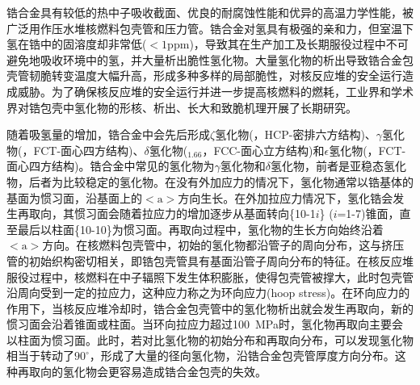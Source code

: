 \maketitle
锆合金具有较低的热中子吸收截面、优良的耐腐蚀性能和优异的高温力学性能，被广泛用作压水堆核燃料包壳管和压力管。锆合金对氢具有极强的亲和力，但室温下氢在锆中的固溶度却非常低\textrm{($<1\mathrm{ppm}$)}，导致其在生产加工及长期服役过程中不可避免地吸收环境中的氢，并大量析出脆性氢化物。大量氢化物的析出导致锆合金包壳管韧脆转变温度大幅升高，形成多种多样的局部脆性，对核反应堆的安全运行造成威胁。为了确保核反应堆的安全运行并进一步提高核燃料的燃耗，工业界和学术界对锆包壳中氢化物的形核、析出、长大和致脆机理开展了长期研究。

随着吸氢量的增加，锆合金中会先后形成$\zeta$氢化物\textrm{(，HCP-密排六方结构)}、$\gamma$氢化物\textrm{(，FCT-面心四方结构)}、$\delta$氢化物\textrm{($_{1.66}$，FCC-面心立方结构)}和$\epsilon$氢化物\textrm{(，FCT-面心四方结构)}。锆合金中常见的氢化物为$\gamma$氢化物和$\delta$氢化物，前者是亚稳态氢化物，后者为比较稳定的氢化物。在没有外加应力的情况下，氢化物通常以锆基体的基面为惯习面，沿基面上的$<\mathrm{a}>$方向生长。在外加拉应力情况下，氢化锆会发生再取向，其惯习面会随着拉应力的增加逐步从基面转向\textrm{\{10-1$i$\} ($i$=1-7)}锥面，直至最后以柱面\{10-10\}为惯习面。再取向过程中，氢化物的生长方向始终沿着$<\mathrm{a}>$方向。在核燃料包壳管中，初始的氢化物都沿管子的周向分布，这与挤压管的初始织构密切相关，即锆包壳管具有基面沿管子周向分布的特征。在核反应堆服役过程中，核燃料在中子辐照下发生体积膨胀，使得包壳管被撑大，此时包壳管沿周向受到一定的拉应力，这种应力称之为环向应力\textrm{(hoop stress)}。在环向应力的作用下，当核反应堆冷却时，锆合金包壳管中的氢化物析出就会发生再取向，新的惯习面会沿着锥面或柱面。当环向拉应力超过\textrm{100~MPa}时，氢化物再取向主要会以柱面为惯习面。此时，若对比氢化物的初始分布和再取向分布，可以发现氢化物相当于转动了$90^{\circ}$，形成了大量的径向氢化物，沿锆合金包壳管厚度方向分布。这种再取向的氢化物会更容易造成锆合金包壳的失效。


